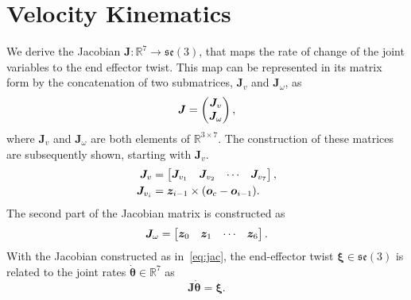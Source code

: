 \section{Velocity Kinematics}
\label{sec:vel}

We derive the Jacobian $\bm{J}: \mathbb{R}^7 \rightarrow \mathfrak{se}(3)$, that
maps the rate of change of the joint variables to the end effector twist.
This map can be represented in its matrix form by the concatenation of two 
submatrices, $\bm{J}_v$ and $\bm{J}_\omega$, as 
\begin{equation} 
  \bm{J} = \begin{pmatrix}\bm{J}_v \\ \bm{J}_\omega\end{pmatrix}, 
  \label{eq:jac}
\end{equation}
where $\bm{J}_v$ and $\bm{J}_\omega$ are both elements of $\mathbb{R}^{3 \times
7}$. The construction of these matrices are subsequently shown, starting with 
$\bm{J}_v$.
%
\begin{align}
\begin{split}
  \bm{J}_v &= \begin{bmatrix}\bm{J}_{v_1} & \bm{J}_{v_2} & \cdots & \bm{J}_{v_7}\end{bmatrix}, \\
  \bm{J}_{v_i} &= \bm{z}_{i-1} \times (\bm{o}_c - \bm{o}_{i-1}).
  \label{eq:jac_v}
\end{split}
\end{align}
%
The second part of the Jacobian matrix is constructed as 
\begin{equation}
  \bm{J}_\omega = \begin{bmatrix}\bm{z}_0 & \bm{z}_1 & \cdots & \bm{z}_6\end{bmatrix}.
  \label{eq:jac_omega}
\end{equation}
%
With the Jacobian constructed as in~\eqref{eq:jac}, the end-effector 
twist $\bm{\xi} \in \mathfrak{se}(3)$ is related to the joint rates 
$\dot{\bm{\theta}} \in \mathbb{R}^7$ as \[ \bm{J} \dot{\bm{\theta}} = \bm{\xi}.
\]
